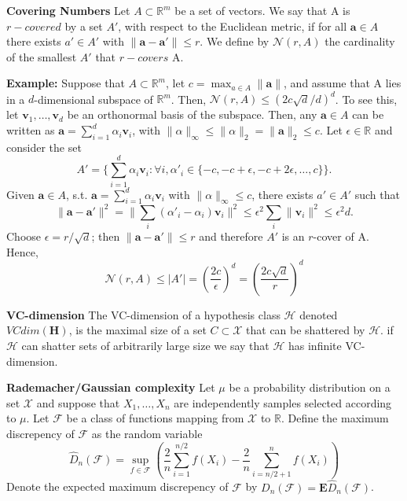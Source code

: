 \documentclass{article}[12pt]
\begin{document}
\textbf{Covering Numbers}
Let $A \subset \mathbb{R}^m$ be a set of vectors. We say that A is $r-covered$ by a set $A'$, with respect to the Euclidean metric, if for all $\textbf{a} \in A$ there exists $a' \in A'$ with $\|\textbf{a}-\textbf{a}'\|\leq r$. We define by $\mathcal{N}(r,A)$ the cardinality of the smallest $A'$ that $r-covers$ A.

\textbf{Example:} Suppose that $A \subset \mathbb{R}^m$, let $c=\max_{a \in A} \|\textbf{a}\|$, and assume that A lies in a $d$-dimensional subspace of $\mathbb{R}^m$. Then, $\mathcal{N}(r,A) \leq (2c\sqrt{d}/d)^d$. To see this, let $\textbf{v}_1, \ldots, \textbf{v}_d$ be an orthonormal basis of the subspace. Then, any $\textbf{a} \in A$ can be written as $\textbf{a} = \sum_{i=1}^d \alpha_i \textbf{v}_i$, with $\|\alpha\|_{\infty}\leq \|\alpha\|_2 = \|\textbf{a}\|_2 \leq c$. Let $\epsilon \in \mathbb{R}$ and consider the set
\begin{equation*}
    A' = \{\sum_{i=1}^d \alpha_i \textbf{v}_i : \forall i, \alpha'_i \in \{-c, -c+\epsilon, -c + 2\epsilon, \ldots, c\}\}.
\end{equation*}Given $\textbf{a} \in A$, s.t. $\textbf{a}=\sum_{i=1}^d \alpha_i \textbf{v}_i$ with $\|\alpha\|_{\infty} \leq c$, there exists $a' \in A'$ such that
\begin{equation*}
    \|\textbf{a}-\textbf{a}'\|^2 = \|\sum_i (\alpha'_i - \alpha_i)\textbf{v}_i\|^2 \leq \epsilon^2 \sum_i \|\textbf{v}_i\|^2 \leq \epsilon^2d.
\end{equation*}Choose $\epsilon = r/\sqrt{d}$; then $\|\textbf{a}-\textbf{a}'\|\leq r$ and therefore $A'$ is an $r$-cover of A. Hence,
\begin{equation*}
    \mathcal{N}(r,A) \leq |A'| = (\frac{2c}{\epsilon})^d = (\frac{2c\sqrt{d}}{r})^d
\end{equation*}

\textbf{VC-dimension}
The VC-dimension of a hypothesis class $\mathcal{H}$ denoted $VCdim(\mathbf{H})$, is the maximal size of a set $C \subset \mathcal{X}$ that can be shattered by $\mathcal{H}$. if $\mathcal{H}$ can shatter sets of arbitrarily large size we say that $\mathcal{H}$ has infinite VC-dimension.

\textbf{Rademacher/Gaussian complexity}
Let $\mu$ be a probability distribution on a set $\mathcal{X}$ and suppose that $X_1, \ldots, X_n$ are independently samples selected according to $\mu$. Let $\mathcal{F}$ be a class of functions mapping from $\mathcal{X}$ to $\mathbb{R}$. Define the maximum discrepency of $\mathcal{F}$ as the random variable
\begin{equation*}
    \hat D_n (\mathcal{F}) = \sup_{f \in \mathcal{F}} (\frac{2}{n}\sum_{i=1}^{n/2}f(X_i)-\frac{2}{n}\sum_{i=n/2+1}^n f(X_i))
\end{equation*}Denote the expected maximum discrepency of $\mathcal{F}$ by $D_n(\mathcal{F})=\textbf{E}\hat D_n(\mathcal{F})$.
\end{document}
